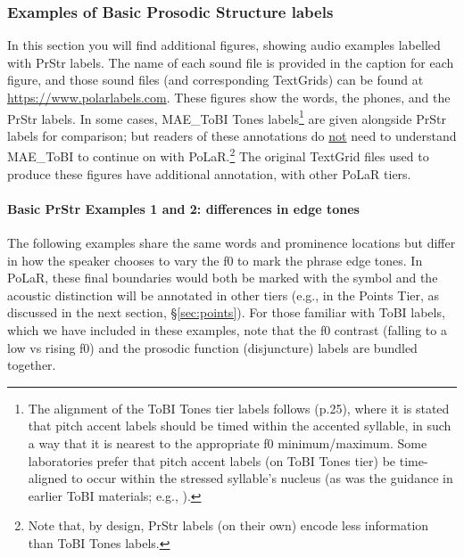 \documentclass[11pt, twoside]{memoir}
\def\textlabel#1{{\relsize{-.5}\fontspec[Mapping=tex-text]{Roboto Mono}{#1}}}
\begin{document}
\subsubsection{Examples of Basic Prosodic Structure labels}\label{sec:more-examples}

In this section you will find additional figures, showing audio examples labelled with PrStr labels. The name of each sound file is provided in the caption for each figure, and those sound files (and corresponding TextGrids) can be found at \url{https://www.polarlabels.com}. These figures show the words, the phones, and the PrStr labels. In some cases, MAE\_ToBI Tones labels\footnote{The alignment of the ToBI Tones tier labels follows \citealt{beckman-05} (p.25), where it is stated that pitch accent labels should be timed within the accented syllable, in such a way that it is nearest to the appropriate f0 minimum\slash maximum. Some laboratories prefer that pitch accent labels (on ToBI Tones tier) be time-aligned to occur within the stressed syllable’s nucleus (as was the guidance in earlier ToBI materials; e.g., \citealt{beckmanhirschberg94}).} are given alongside PrStr labels for comparison; but readers of these annotations do \uline{not} need to understand MAE\_ToBI to continue on with PoLaR.\footnote{Note that, by design, PrStr labels (on their own) encode less information than ToBI Tones labels.} The original TextGrid files used to produce these figures have additional annotation, with other PoLaR tiers.

\paragraph{Basic PrStr Examples 1 and 2: differences in edge tones}

The following examples share the same words and prominence locations but differ in how the speaker chooses to vary the f0 to mark the phrase edge tones. In PoLaR, these final boundaries would both be marked with the \textlabel{]} symbol and the acoustic distinction will be annotated in other tiers (e.g., in the Points Tier, as discussed in the next section, §\ref{sec:points}). For those familiar with ToBI labels, which we have included in these examples, note that the f0 contrast (falling to a low vs rising f0) and the prosodic function (disjuncture) labels are bundled together. 
\end{document}
